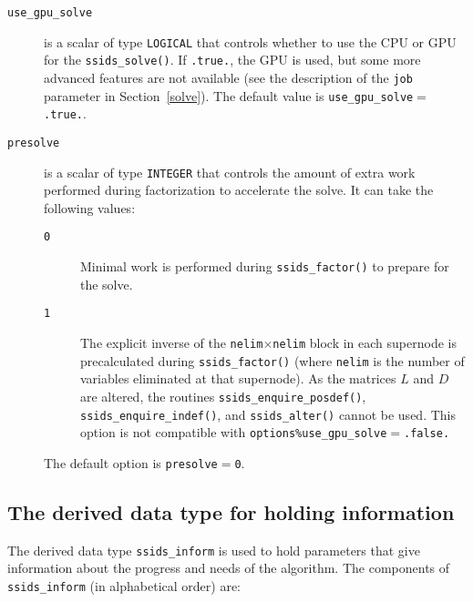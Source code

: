 
\begin{description}
\item[\texttt{use\_gpu\_solve}] is a scalar of type {\tt LOGICAL} that controls
   whether to use the CPU or GPU for the \texttt{ssids\_solve()}. If
   \texttt{.true.}, the GPU is used, but some more advanced features are not
   available (see the description of the \texttt{job} parameter in
   Section~\ref{solve}).
   The default value is \texttt{use\_gpu\_solve}$=$\texttt{.true.}.
\item[\texttt{presolve}] is a scalar of type {\tt INTEGER} that controls the
   amount of extra work performed during factorization to accelerate the solve.
   It can take the following values:
   \begin{description}
      \item[\texttt{0}] Minimal work is performed during {\tt ssids\_factor()}
         to prepare for the solve.
      \item[\texttt{1}] The explicit inverse of the
         \texttt{nelim}$\times$\texttt{nelim} block in each supernode is
         precalculated during {\tt ssids\_factor()} (where \texttt{nelim} is
         the number of variables eliminated at that supernode). As the matrices
         $L$ and $D$ are altered, the routines {\tt ssids\_enquire\_posdef()},
         {\tt ssids\_enquire\_indef()}, and {\tt ssids\_alter()} cannot be used.
         This option is not compatible with {\tt options\%use\_gpu\_solve}$=$\texttt{.false.}
   \end{description}
   The default option is \texttt{presolve}$=$\texttt{0}.
\end{description}


\subsection{The derived data type for holding information}
\label{typeinform}
The derived data type {\tt ssids\_inform}
is used to hold parameters that give information about the progress and needs
of the algorithm. The components of {\tt ssids\_inform}
(in alphabetical order) are:

